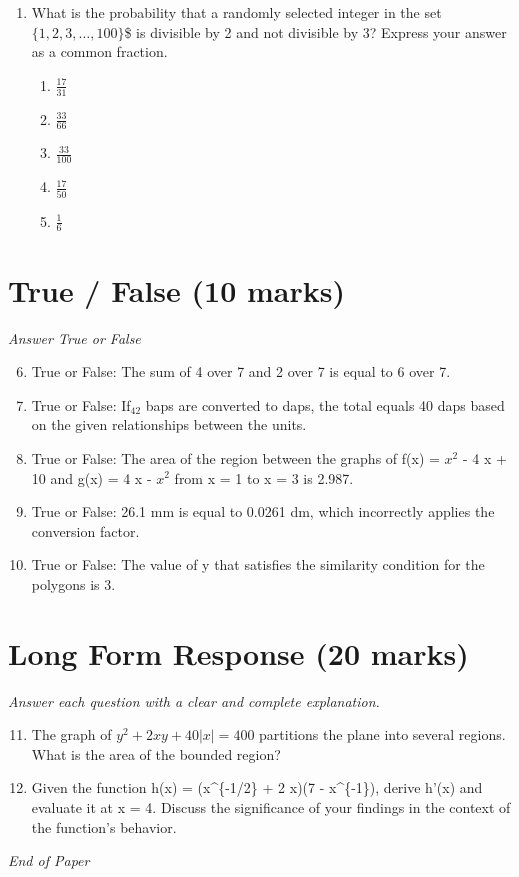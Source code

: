 \documentclass[12pt]{article}
\begin{document}
\begin{enumerate}[label=\arabic*.]
\begin{enumerate}[label=(\alph*)]
    \item 2 x + 2 x and 2 $x^2$
    \item x+x+x+x and $x^4$
    \item 3 x + 5 x and 15 x
    \item 4(2 x - 6) and 8 x - 24
    \item 3 x + 3 x + 3 x and 3 $x^3$
\end{enumerate}
\item What is the probability that a randomly selected integer in the set $\{1,2,3,\ldots,100\}$\$ is divisible by 2 and not divisible by 3? Express your answer as a common fraction.
\begin{enumerate}[label=(\alph*)]
    \item \ensuremath{\frac{17}{31}}
    \item \ensuremath{\frac{33}{66}}
    \item \ensuremath{\frac{33}{100}}
    \item \ensuremath{\frac{17}{50}}
    \item \ensuremath{\frac{1}{6}}
\end{enumerate}
\end{enumerate}

\section*{True / False (10 marks)}
\textit{Answer True or False}
\begin{enumerate}[label=\arabic*.]
\setcounter{enumi}{5}
\item True or False: The sum of 4 over 7 and 2 over 7 is equal to 6 over 7.
\item True or False: If$_{42}$ baps are converted to daps, the total equals 40 daps based on the given relationships between the units.
\item True or False: The area of the region between the graphs of f(x) = $x^2$ - 4 x + 10 and g(x) = 4 x - $x^2$ from x = 1 to x = 3 is 2.987.
\item True or False: 26.1 mm is equal to 0.0261 dm, which incorrectly applies the conversion factor.
\item True or False: The value of y that satisfies the similarity condition for the polygons is 3.
\end{enumerate}

\section*{Long Form Response (20 marks)}
\textit{Answer each question with a clear and complete explanation.}
\begin{enumerate}[label=\arabic*.]
\setcounter{enumi}{10}
\item The graph of $y^2 + 2 xy + 40|x|= 400$ partitions the plane into several regions. What is the area of the bounded region?
\item Given the function h(x) = (x^\{-1/2\} + 2 x)(7 - x^\{-1\}), derive h'(x) and evaluate it at x = 4. Discuss the significance of your findings in the context of the function's behavior.
\end{enumerate}

\vfill
\noindent\textit{End of Paper}
\end{document}
